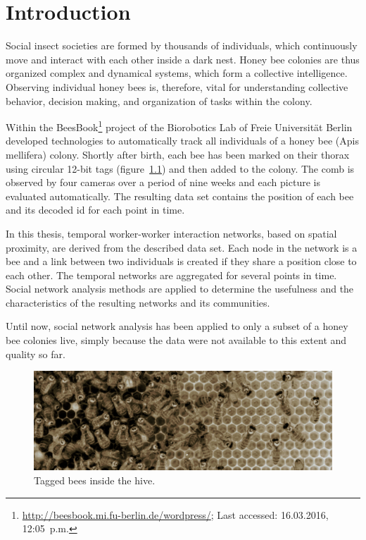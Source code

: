 \chapter{Introduction}
\label{ch:intro}

Social insect societies are formed by thousands of individuals, which continuously move and interact with each other inside a dark nest. Honey bee colonies are thus organized complex and dynamical systems, which form a collective intelligence. Observing individual honey bees is, therefore, vital for understanding collective behavior, decision making, and organization of tasks within the colony.

Within the BeesBook\footnote{\url{http://beesbook.mi.fu-berlin.de/wordpress/}; Last accessed: 16.03.2016, 12:05~p.m.} project of the Biorobotics Lab of Freie Universität Berlin~\textcite{wario2015automatic} developed technologies to automatically track all individuals of a honey bee (Apis mellifera) colony. Shortly after birth, each bee has been marked on their thorax using circular 12-bit tags (figure~\ref{fig:markers}) and then added to the colony. The comb is observed by four cameras over a period of nine weeks and each picture is evaluated automatically. The resulting data set contains the position of each bee and its decoded id for each point in time.

In this thesis, temporal worker-worker interaction networks, based on spatial proximity, are derived from the described data set. Each node in the network is a bee and a link between two individuals is created if they share a position close to each other. The temporal networks are aggregated for several points in time.  Social network analysis methods are applied to determine the usefulness and the characteristics of the resulting networks and its communities.

Until now, social network analysis has been applied to only a subset of a honey bee colonies live, simply because the data were not available to this extent and quality so far.

\begin{figure}[htb]
	\centering
	\includegraphics[width=1.0\textwidth]{Figures/markers}
	\caption{Tagged bees inside the hive.}
	\label{fig:markers}
\end{figure}


